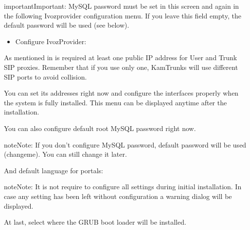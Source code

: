 \documentclass[letterpaper,10pt,english]{sphinxmanual}
\begin{document}
\noindent{}

\begin{notice}{important}{Important:}
MySQL password must be set in this screen and again in the following
Ivozprovider configuration menu. If you leave this field empty, the default password
will be used (see below).
\end{notice}
\begin{itemize}
\item {} 
Configure IvozProvider:

\end{itemize}

\noindent{}

As mentioned in {\hyperref[basic_concepts/installation/requirements:minimum\string-requirements]{}} is required at least one public IP
address for User and Trunk SIP proxies. Remember that if you use only one,
KamTrunks will use different SIP ports to avoid collision.

You can set its addresses right now and configure the interfaces properly when
the system is fully installed. This menu can be displayed anytime after the
installation.

\noindent{}

You can also configure default root MySQL password right now.

\begin{notice}{note}{Note:}
If you don't configure MySQL password, default password will be used
(changeme). You can still change it later.
\end{notice}

\noindent{}

And default language for portals:

\noindent{}

\begin{notice}{note}{Note:}
It is not require to configure all settings during initial
installation. In case any setting has been left without configuration a
warning dialog will be displayed.
\end{notice}

\noindent{}

At last, select where the GRUB boot loader will be installed.
\end{document}
